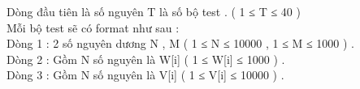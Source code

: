 Dòng đầu tiên là số nguyên T là số bộ test . ( 1 ≤ T ≤ 40 )
\\Mỗi bộ test sẽ có format như sau :
\\Dòng 1 : 2 số nguyên dương N , M ( 1 ≤ N ≤ 10000 , 1 ≤ M ≤ 1000 ) .
\\Dòng 2 : Gồm N số nguyên là W[i] ( 1 ≤ W[i] ≤ 1000 ) .
\\Dòng 3 : Gồm N số nguyên là V[i] ( 1 ≤ V[i] ≤ 10000 ) .